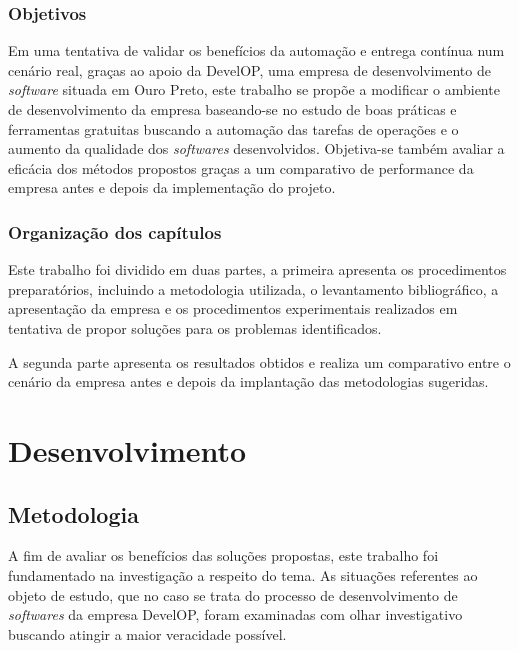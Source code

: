 \documentclass[
12pt,				%
openright,			%
oneside,			%
a4paper,			%
english,			%
french,				%
spanish,			%
brazil,				%
]{abntex2}
\begin{document}
\section{Objetivos}

Em uma tentativa de validar os benefícios da automação e entrega contínua num cenário real, graças ao apoio da DevelOP, uma empresa de desenvolvimento de \textit{software} situada em Ouro Preto, este trabalho se propõe a modificar o ambiente de desenvolvimento da empresa baseando-se no estudo de boas práticas e ferramentas gratuitas buscando a automação das tarefas de operações e o aumento da qualidade dos \textit{softwares} desenvolvidos. Objetiva-se também avaliar a eficácia dos métodos propostos graças a um comparativo de performance da empresa antes e depois da implementação do projeto.

\section{Organização dos capítulos}

Este trabalho foi dividido em duas partes, a primeira apresenta os procedimentos preparatórios, incluindo a metodologia utilizada, o levantamento bibliográfico, a apresentação da empresa e os procedimentos experimentais realizados em tentativa de propor soluções para os problemas identificados.

A segunda parte apresenta os resultados obtidos e realiza um comparativo entre o cenário da empresa antes e depois da implantação das metodologias sugeridas.

\part{Desenvolvimento}

\chapter{Metodologia}

A fim de avaliar os benefícios das soluções propostas, este trabalho foi fundamentado na investigação a respeito do tema. As situações referentes ao objeto de estudo, que no caso se trata do processo de desenvolvimento de \textit{softwares} da empresa DevelOP, foram examinadas com olhar investigativo buscando atingir a maior veracidade possível.
\end{document}
